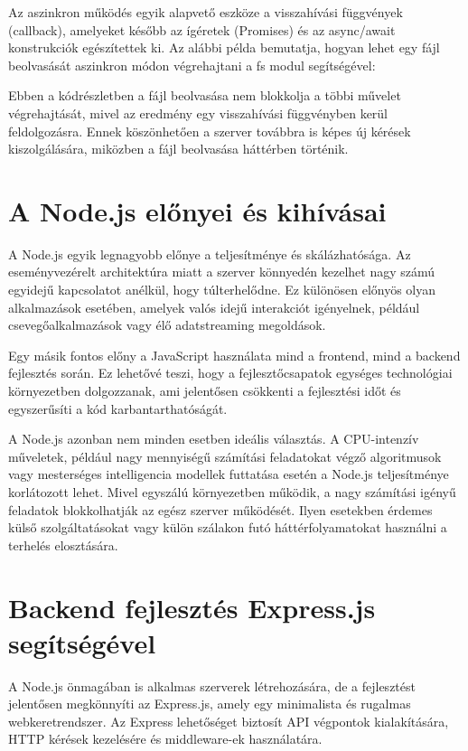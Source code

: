 \documentclass[
]{thesis-ekf}
\theoremstyle{definition}
\theoremstyle{remark}
\begin{document}
Az aszinkron működés egyik alapvető eszköze a visszahívási függvények (callback), amelyeket később az ígéretek (Promises) és az async/await konstrukciók egészítettek ki. Az alábbi példa bemutatja, hogyan lehet egy fájl beolvasását aszinkron módon végrehajtani a fs modul segítségével:

%

Ebben a kódrészletben a fájl beolvasása nem blokkolja a többi művelet végrehajtását, mivel az eredmény egy visszahívási függvényben kerül feldolgozásra. Ennek köszönhetően a szerver továbbra is képes új kérések kiszolgálására, miközben a fájl beolvasása háttérben történik.

\section{A Node.js előnyei és kihívásai}
A Node.js egyik legnagyobb előnye a teljesítménye és skálázhatósága. Az eseményvezérelt architektúra miatt a szerver könnyedén kezelhet nagy számú egyidejű kapcsolatot anélkül, hogy túlterhelődne. Ez különösen előnyös olyan alkalmazások esetében, amelyek valós idejű interakciót igényelnek, például csevegőalkalmazások vagy élő adatstreaming megoldások.

Egy másik fontos előny a JavaScript használata mind a frontend, mind a backend fejlesztés során. Ez lehetővé teszi, hogy a fejlesztőcsapatok egységes technológiai környezetben dolgozzanak, ami jelentősen csökkenti a fejlesztési időt és egyszerűsíti a kód karbantarthatóságát.

A Node.js azonban nem minden esetben ideális választás. A CPU-intenzív műveletek, például nagy mennyiségű számítási feladatokat végző algoritmusok vagy mesterséges intelligencia modellek futtatása esetén a Node.js teljesítménye korlátozott lehet. Mivel egyszálú környezetben működik, a nagy számítási igényű feladatok blokkolhatják az egész szerver működését. Ilyen esetekben érdemes külső szolgáltatásokat vagy külön szálakon futó háttérfolyamatokat használni a terhelés elosztására.

\section{Backend fejlesztés Express.js segítségével}

A Node.js önmagában is alkalmas szerverek létrehozására, de a fejlesztést jelentősen megkönnyíti az Express.js, amely egy minimalista és rugalmas webkeretrendszer. Az Express lehetőséget biztosít API végpontok kialakítására, HTTP kérések kezelésére és middleware-ek használatára.
\end{document}
